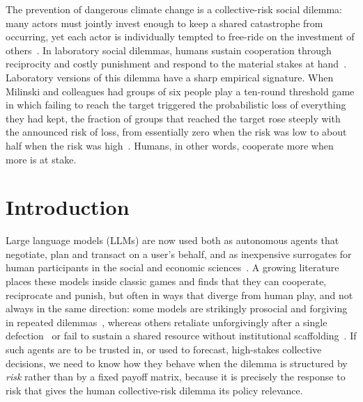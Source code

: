 \documentclass[openacc]{rsproca_new}
\begin{document}
\begin{abstract}
\end{abstract}

\begin{fmtext}
The prevention of dangerous climate change is a collective-risk social dilemma: many actors must jointly invest enough to keep a shared catastrophe from occurring, yet each actor is individually tempted to free-ride on the investment of others~\cite{milinski2008collective,hardin1968tragedy,dawes1980social}. In laboratory social dilemmas, humans sustain cooperation through reciprocity and costly punishment and respond to the material stakes at hand~\cite{fehr2002altruistic}. Laboratory versions of this dilemma have a sharp empirical signature. When Milinski and colleagues had groups of six people play a ten-round threshold game in which failing to reach the target triggered the probabilistic loss of everything they had kept, the fraction of groups that reached the target rose steeply with the announced risk of loss, from essentially zero when the risk was low to about half when the risk was high~\cite{milinski2008collective}. Humans, in other words, cooperate more when more is at stake.
\end{fmtext}

\maketitle

\section{Introduction}

Large language models (LLMs) are now used both as autonomous agents that negotiate, plan and transact on a user's behalf, and as inexpensive surrogates for human participants in the social and economic sciences~\cite{horton2023large,argyle2023out,aher2023using}. A growing literature places these models inside classic games and finds that they can cooperate, reciprocate and punish, but often in ways that diverge from human play, and not always in the same direction: some models are strikingly prosocial and forgiving in repeated dilemmas~\cite{fontana2024nicer,phelps2023investigating}, whereas others retaliate unforgivingly after a single defection~\cite{akata2023playing} or fail to sustain a shared resource without institutional scaffolding~\cite{piatti2024cooperate}. If such agents are to be trusted in, or used to forecast, high-stakes collective decisions, we need to know how they behave when the dilemma is structured by \emph{risk} rather than by a fixed payoff matrix, because it is precisely the response to risk that gives the human collective-risk dilemma its policy relevance.
\end{document}
